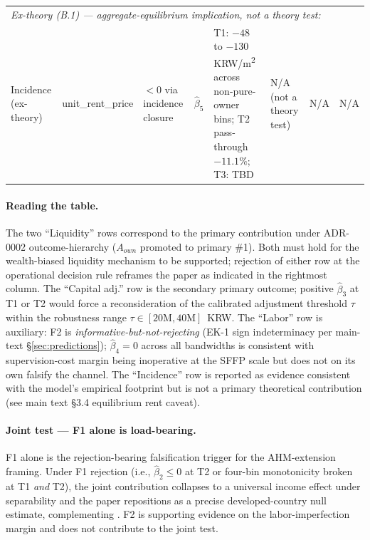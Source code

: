 \documentclass[11pt, a4paper]{article}
\begin{document}
\begin{landscape}
\begin{table}[ht]
\begin{tabular}{p{2.0cm} p{1.6cm} p{0.9cm} p{1.0cm} p{3.6cm} p{3.4cm} p{4.8cm} p{2.0cm}}
\midrule
\multicolumn{8}{l}{\textit{Ex-theory (B.1) --- aggregate-equilibrium implication, not a theory test:}} \\
Incidence (ex-theory) \citep{Floyd1965_incidence, AlstonJames2002_incidence} & unit\_rent\_price & $< 0$ via incidence closure & $\hat\beta_5$ & T1: $-48$ to $-130$ KRW/m\textsuperscript{2} across non-pure-owner bins; T2 pass-through $-11.1\%$; T3: TBD & N/A (not a theory test) & N/A & N/A \\
\bottomrule
\end{tabular}
\end{table}
\end{landscape}

\paragraph{Reading the table.} The two ``Liquidity'' rows correspond to the
primary contribution under ADR-0002 outcome-hierarchy ($A_{own}$ promoted to
primary \#1). Both must hold for the wealth-biased liquidity mechanism to be
supported; rejection of either row at the operational decision rule reframes
the paper as indicated in the rightmost column. The ``Capital adj.'' row is the
secondary primary outcome; positive $\hat\beta_3$ at T1 or T2 would force a
reconsideration of the calibrated adjustment threshold $\tau$ within the
robustness range $\tau \in [20\text{M}, 40\text{M}]$~KRW. The ``Labor'' row is
auxiliary: F2 is \emph{informative-but-not-rejecting} (EK-1 sign indeterminacy
per main-text \S\ref{sec:predictions}); $\hat\beta_4 = 0$ across all
bandwidths is consistent with supervision-cost margin being inoperative at the
SFFP scale but does not on its own falsify the channel. The ``Incidence'' row
is reported as evidence consistent with the model's empirical footprint but is
not a primary theoretical contribution (see main text \S 3.4 equilibrium rent
caveat).

\paragraph{Joint test --- F1 alone is load-bearing.} F1 alone is the
rejection-bearing falsification trigger for the AHM-extension framing. Under F1
rejection (i.e., $\hat\beta_2 \le 0$ at T2 or four-bin monotonicity broken at
T1 \emph{and} T2), the joint contribution collapses to a universal income
effect under separability and the paper repositions as a precise
developed-country null estimate, complementing
\citet{LaFaveThomas2016_markets}. F2 is supporting evidence on the
labor-imperfection margin and does not contribute to the joint test.



\end{document}
